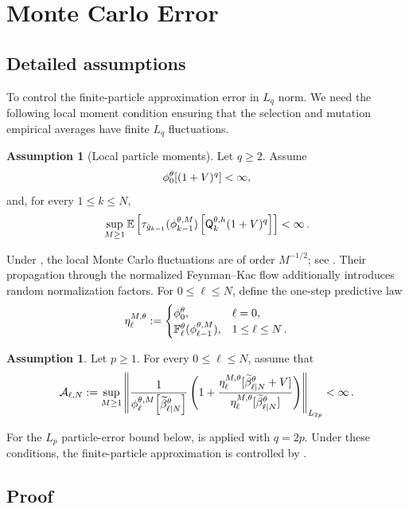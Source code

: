 \documentclass[11pt]{article}
\theoremstyle{plain}
\theoremstyle{definition}
\newtheorem{assumption}[theorem]{Assumption}
\theoremstyle{remark}
\begin{document}
\section{Monte Carlo Error}
\label{app:monte_carlo}

\subsection{Detailed assumptions}
\label{app:detailed_monte_carlo_assumptions}

To control the finite-particle approximation error in $L_q$ norm. We need the following local moment condition ensuring that the selection and mutation empirical averages have finite $L_q$ fluctuations.

\begin{assumption}[Local particle moments]
\label{ass:local_lp_bound_moment}
Let $q\ge2$. Assume
$$
\approxfilter{0}[(1+V)^q]<\infty,
$$
and, for every $1\le k\le N$,
$$
\sup_{M\ge1} \E\left[ \tau_{\approxpot{k-1}}(\mcfilter{k-1}) \left[ \mk{k}[\theta,h](1+V)^q \right] \right] < \infty \eqsp.
$$
\end{assumption}
%
Under , the local Monte Carlo
fluctuations are of order $M^{-1/2}$; see
. Their propagation through the normalized
Feynman--Kac flow additionally introduces random normalization
factors.
%
%
For $0\le\ell\le N$, define the one-step predictive law
$$
\eta_\ell^{M,\theta} \eqdef \begin{cases} \approxfilter{0}, & \ell=0,\\ \filtertransform{\ell}[\theta](\mcfilter{\ell-1}), & 1\le \ell\le N \eqsp.
\end{cases}
$$
\begin{assumption}
\label{ass:mc_normalization_moments}
Let $p\ge1$. For every $0\le \ell\le N$, assume that
$$
\mathcal A_{\ell,N} \eqdef \sup_{M\ge1} \normEc{ \frac{1}{ \mcfilter{\ell} [ \normbackwardfun{\ell}{N}[\theta] ]} \left( 1+ \frac{ \eta_\ell^{M,\theta} [ \normbackwardfun{\ell}{N}[\theta]+V ] }{ \eta_\ell^{M,\theta} [ \normbackwardfun{\ell}{N}[\theta] ] } \right) }_{L_{2p}} <\infty \eqsp.
$$
\end{assumption}
For the $L_p$ particle-error bound below,
 is applied with $q=2p$.
Under these conditions, the finite-particle approximation is controlled
by .


\subsection{Proof}
\end{document}
